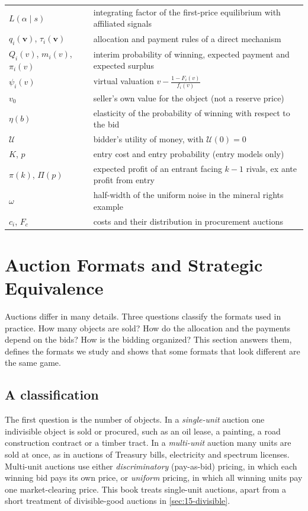 \begin{table}[htbp]
\begin{tabularx}{\textwidth}{@{}p{3.6cm}X@{}}
$L(\alpha\mid s)$ & integrating factor of the first-price equilibrium with affiliated signals \\
$q_i(\bm v)$, $\tau_i(\bm v)$ & allocation and payment rules of a direct mechanism \\
$Q_i(v)$, $m_i(v)$, $\pi_i(v)$ & interim probability of winning, expected payment and expected surplus \\
$\psi_i(v)$ & virtual valuation $v-\frac{1-F_i(v)}{f_i(v)}$ \\
$v_0$ & seller's own value for the object (not a reserve price) \\
$\eta(b)$ & elasticity of the probability of winning with respect to the bid \\
$\mathcal{U}$ & bidder's utility of money, with $\mathcal{U}(0)=0$ \\
$K$, $p$ & entry cost and entry probability (entry models only) \\
$\pi(k)$, $\Pi(p)$ & expected profit of an entrant facing $k-1$ rivals, ex ante profit from entry \\
$\omega$ & half-width of the uniform noise in the mineral rights example \\
$c_i$, $F_c$ & costs and their distribution in procurement auctions \\
\bottomrule
\end{tabularx}
\end{table}

\section{Auction Formats and Strategic Equivalence}\label{sec:14-formats}

Auctions differ in many details. Three questions classify the formats used in practice. How many objects
are sold? How do the allocation and the payments depend on the bids? How is the bidding organized? This
section answers them, defines the formats we study and shows that some formats that look different are the
same game.

\subsection{A classification}\label{sec:14-formats-class}

The first question is the number of objects. In a \emph{single-unit} auction one indivisible object is sold
or procured, such as an oil lease, a painting, a road construction contract or a timber tract. In a
\emph{multi-unit} auction many units are sold at once, as in auctions of Treasury bills, electricity and
spectrum licenses. Multi-unit auctions use either \emph{discriminatory} (pay-as-bid) pricing, in which each
winning bid pays its own price, or \emph{uniform} pricing, in which all winning units pay one
market-clearing price. This book treats single-unit auctions, apart from a short treatment of
divisible-good auctions in \cref{sec:15-divisible}.

